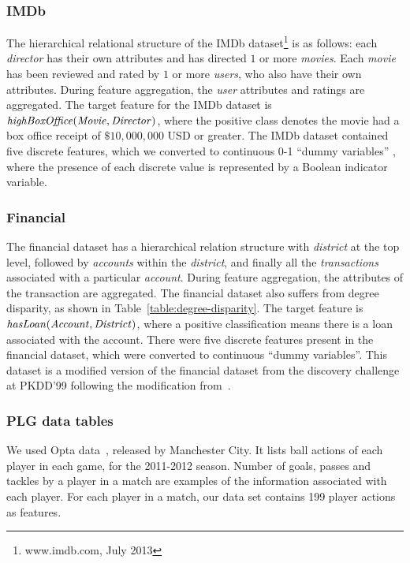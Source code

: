 \documentclass[conference]{IEEEtran}
\begin{document}
\subsubsection{IMDb}
The hierarchical relational structure of the IMDb dataset\footnote{www.imdb.com, July 2013} is as follows: each \textit{director} has their own attributes and has directed $1$ or more \textit{movies}. Each \textit{movie} has been reviewed and rated by $1$ or more \textit{users}, who also have their own attributes. During feature aggregation, the \textit{user} attributes and ratings are aggregated. The target feature for the IMDb dataset is $\it{highBoxOffice(Movie,Director)}$, where the positive class denotes the movie had a box office receipt of $\$10,000,000$  USD or greater. The IMDb dataset contained five discrete features, which we converted to continuous 0-1 ``dummy variables'' \cite{Gelman2007}, where the presence of each discrete value is represented by a Boolean indicator variable. %

\subsubsection{Financial}
The financial dataset has a hierarchical relation structure with \textit{district} at the top level, followed by \textit{accounts} within the \textit{district}, and finally all the \textit{transactions} associated with a particular \textit{account}. During feature aggregation, the attributes of the transaction are aggregated. The financial dataset also suffers from degree disparity, as shown in Table~\ref{table:degree-disparity}. The target feature is $\it{hasLoan(Account,District)}$, where a positive classification means there is a loan associated with the account. There were five discrete features present in the financial dataset, which were converted to continuous ``dummy variables''. This dataset is a modified version of the financial dataset from the discovery challenge at PKDD'99 following the modification from~\cite{Yin2004}.

\subsubsection{PLG data tables}
We used Opta data~\cite{bib:opta-original}, released by Manchester City. It lists ball actions of each player in each game, for the 2011-2012 season.
Number of goals, passes and tackles by a player in a match are examples of the information associated with each player.
For each player in a match, our data set contains 199 player actions as features.
\end{document}
